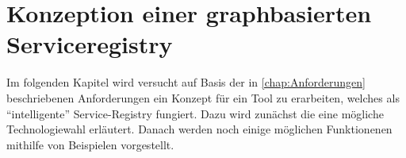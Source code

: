 \documentclass[
	12pt,
	BCOR=5mm,
	DIV=12,
	headinclude=on,
	footinclude=off,
	parskip=half,
	bibliography=totoc,
	listof=entryprefix,
	toc=listof,
	numbers=noenddot,
	plainfootsepline
]{scrreprt}
\begin{document}


\chapter{Konzeption einer graphbasierten Serviceregistry}

Im folgenden Kapitel wird versucht auf Basis der in \vref{chap:Anforderungen} beschriebenen Anforderungen ein Konzept für ein Tool zu erarbeiten, welches als \enquote{intelligente} Service-Registry fungiert. Dazu wird zunächst die eine mögliche Technologiewahl erläutert. Danach werden noch einige möglichen Funktionenen mithilfe von Beispielen vorgestellt.
\end{document}
